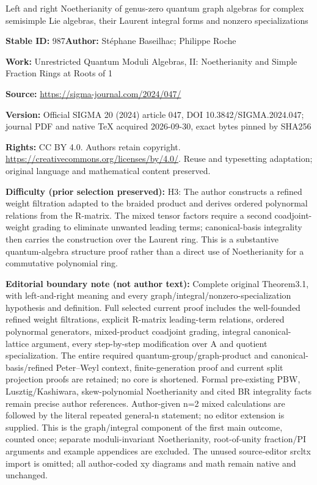 \documentclass[11pt]{article}
\numberwithin{equation}{section}
\numberwithin{equation}{section}
\theoremstyle{definition}
\begin{document}
\begin{center}\Large Left and right Noetherianity of genus-zero quantum graph algebras for complex semisimple Lie algebras, their Laurent integral forms and nonzero specializations\end{center}
\noindent\textbf{Stable ID:} 987\quad\textbf{Author:} Stéphane Baseilhac; Philippe Roche\par
\noindent\textbf{Work:} Unrestricted Quantum Moduli Algebras, II: Noetherianity and Simple Fraction Rings at Roots of 1\par
\noindent\textbf{Source:} \url{https://sigma-journal.com/2024/047/}\par
\noindent\textbf{Version:} Official SIGMA 20 (2024) article 047, DOI 10.3842/SIGMA.2024.047; journal PDF and native TeX acquired 2026-09-30, exact bytes pinned by SHA256\par
\noindent\textbf{Rights:} CC BY 4.0. Authors retain copyright. \url{https://creativecommons.org/licenses/by/4.0/}. Reuse and typesetting adaptation; original language and mathematical content preserved.\par
\noindent\textbf{Difficulty (prior selection preserved):} {\CJKfont H3: The author constructs a refined weight filtration adapted to the braided product and derives ordered polynormal relations from the R-matrix. The mixed tensor factors require a second coadjoint-weight grading to eliminate unwanted leading terms; canonical-basis integrality then carries the construction over the Laurent ring. This is a substantive quantum-algebra structure proof rather than a direct use of Noetherianity for a commutative polynomial ring.}\par
\medskip\noindent\textbf{Editorial boundary note (not author text):} Complete original Theorem3.1, with left-and-right meaning and every graph/integral/nonzero-specialization hypothesis and definition. Full selected current proof includes the well-founded refined weight filtrations, explicit R-matrix leading-term relations, ordered polynormal generators, mixed-product coadjoint grading, integral canonical-lattice argument, every step-by-step modification over A and quotient specialization. The entire required quantum-group/graph-product and canonical-basis/refined Peter–Weyl context, finite-generation proof and current split projection proofs are retained; no core is shortened. Formal pre-existing PBW, Lusztig/Kashiwara, skew-polynomial Noetherianity and cited BR integrality facts remain precise author references. Author-given n=2 mixed calculations are followed by the literal repeated general-n statement; no editor extension is supplied. This is the graph/integral component of the first main outcome, counted once; separate moduli-invariant Noetherianity, root-of-unity fraction/PI arguments and example appendices are excluded. The unused source-editor srcltx import is omitted; all author-coded xy diagrams and math remain native and unchanged.\par
\end{document}
